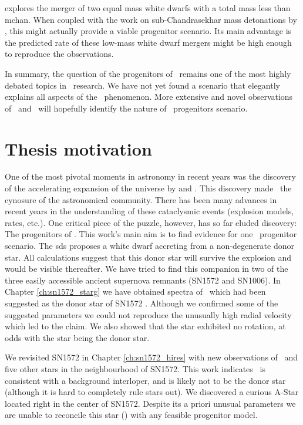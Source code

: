 \citet{2010ApJ...722L.157V} explores the merger of two equal mass white dwarfs with a total mass less than \gls{mchan}. When coupled with the work on sub-Chandrasekhar mass detonations by \citet{2010ApJ...714L..52S}, this might actually provide a viable progenitor scenario. Its main advantage is the predicted rate of these low-mass white dwarf mergers might be high enough to reproduce the observations. 

In summary, the question of the progenitors of \sneia\ remains one of the most highly debated topics in \sneia\ research. We have not yet found a scenario that elegantly explains all aspects of the \snia\ phenomenon. More extensive and novel observations of \sneia\ and \snr\ will hopefully identify the nature of \snia\ progenitors scenario.



\section{Thesis motivation}
One of the most pivotal moments in astronomy in recent years was the discovery of the accelerating expansion of the universe by \citet{1998AJ....116.1009R} and \citet{1999ApJ...517..565P}. This discovery made \sneia\ the cynosure of the astronomical community. There has been many advances in recent years in the understanding of these cataclysmic events (explosion models, rates, etc.). One critical piece of the puzzle, however, has so far eluded discovery: The progenitors of \sneia. This work's main aim is to find evidence for one \snia\ progenitor scenario. The \gls{sds} proposes a white dwarf accreting from a non-degenerate donor star. All calculations suggest that this donor star will survive the explosion and would be visible thereafter. We have tried to find this companion in two of the three easily accessible ancient supernova remnants (SN1572 and SN1006). In Chapter \ref{ch:sn1572_starg} we have obtained spectra of \starg\ which had been suggested as the donor star of SN1572 \citep{2004Natur.431.1069R}. Although we confirmed some of the suggested parameters we could not reproduce the unusually high radial velocity which led to the claim.  We also showed that the star exhibited no rotation, at odds with the star being the donor star.

We revisited SN1572 in Chapter \ref{ch:sn1572_hires} with new observations of \starg\ and five other stars in the neighbourhood of SN1572. This work indicates \starg\ is consistent with a background interloper, and is likely not to be the donor star (although it is hard to completely rule stars out). We discovered a curious A-Star located right in the center of SN1572. Despite its a priori unusual parameters we are unable to reconcile this star (\starb) with any feasible progenitor model. 

